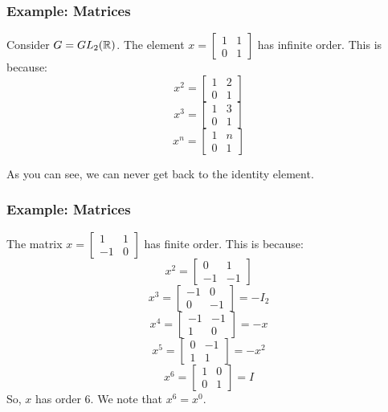 \documentclass[letterpaper]{article}
\begin{document}
\subsubsection{Example: Matrices}
Consider $G = GL_{2}(\mathbb{R})$. The element $x = \begin{bmatrix}
    1 & 1 \\ 
    0 & 1
\end{bmatrix}$ has infinite order. This is because: 
\[x^2 = \begin{bmatrix}
    1 & 2 \\ 
    0 & 1
\end{bmatrix}\]
\[x^3 = \begin{bmatrix}
    1 & 3 \\ 
    0 & 1
\end{bmatrix}\]
\[x^n = \begin{bmatrix}
    1 & n \\ 
    0 & 1
\end{bmatrix}\]

As you can see, we can never get back to the identity element. 

\subsubsection{Example: Matrices}
The matrix $x = \begin{bmatrix}
    1 & 1 \\ 
    -1 & 0
\end{bmatrix}$ has finite order. This is because: 
\[x^2 = \begin{bmatrix}
    0 & 1 \\ 
    -1 & -1
\end{bmatrix}\]
\[x^3 = \begin{bmatrix}
    -1 & 0 \\ 
    0 & -1
\end{bmatrix} = -I_2\]
\[x^4 = \begin{bmatrix}
    -1 & -1 \\ 
    1 & 0
\end{bmatrix} = -x\]
\[x^5 = \begin{bmatrix}
    0 & -1 \\ 
    1 & 1
\end{bmatrix} = -x^2\]
\[x^6 = \begin{bmatrix}
    1 & 0 \\ 
    0 & 1
\end{bmatrix} = I\]
So, $x$ has order 6. We note that $x^6 = x^0$. 
\end{document}
